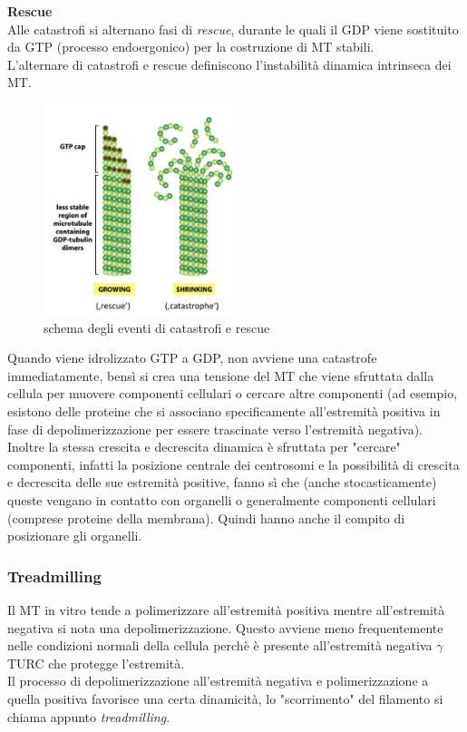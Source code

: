             \textbf{Rescue}\\
                Alle catastrofi si alternano fasi di \textit{rescue}, durante le quali il GDP viene sostituito da GTP (processo endoergonico) per la costruzione di MT stabili.\\
            
            L'alternare di catastrofi e rescue definiscono l'instabilità dinamica intrinseca dei MT.
            \begin{figure}[h]
                    \centering
                    \includegraphics[width=0.5\textwidth]{images/rescue_catastrofe.JPG}
                    \caption{\small schema degli eventi di catastrofi e rescue}
                    \label{fig:mesh1}
            \end{figure}
            Quando viene idrolizzato GTP a GDP, non avviene una catastrofe immediatamente, bensì si crea una tensione del MT che viene sfruttata dalla cellula per muovere componenti cellulari o cercare altre componenti (ad esempio, esistono delle proteine che si associano specificamente all'estremità positiva in fase di depolimerizzazione per essere trascinate verso l'estremità negativa).\\
            Inoltre la stessa crescita e decrescita dinamica è sfruttata per "cercare" componenti, infatti la posizione centrale dei centrosomi e la possibilità di crescita e decrescita delle sue estremità positive, fanno sì che (anche stocasticamente) queste vengano in contatto con organelli o generalmente componenti cellulari (comprese proteine della membrana). Quindi hanno anche il compito di posizionare gli organelli.
                
        \subsubsection{Treadmilling}
            Il MT in vitro tende a polimerizzare all'estremità positiva mentre all'estremità negativa si nota una depolimerizzazione. Questo avviene meno frequentemente nelle condizioni normali della cellula perchè è presente all'estremità negativa $\gamma$TURC che protegge l'estremità.\\
            Il processo di depolimerizzazione all'estremità negativa e polimerizzazione a quella positiva favorisce una certa dinamicità, lo "scorrimento" del filamento si chiama appunto \textit{treadmilling}.
            
